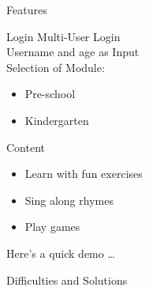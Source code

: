 \documentclass[14pt]{beamer}
\begin{document}
\begin{frame}[standout]
    \alert{Features}
\end{frame}


\begin{frame}{Login}
    \pause
    Multi-User Login \\
    \pause
    Username and age as Input \\
    \pause
    Selection of Module: \\
    \begin{itemize}
    	\item Pre-school
        \item Kindergarten
    \end{itemize}
\end{frame}


\begin{frame}{Content}
    \begin{itemize}
            \pause
        \item Learn with fun exercises \\
            \pause
        \item Sing along rhymes \\
            \pause
        \item Play games \\
    \end{itemize}
\end{frame}


\begin{frame}[standout]
    \alert{Here's a quick demo \ldots}
\end{frame}


\begin{frame}[standout]
    \alert{Difficulties and Solutions}
\end{frame}
\end{document}
